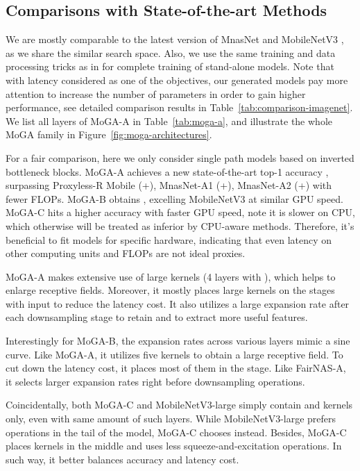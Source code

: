 \documentclass[letterpaper]{article} \usepackage{aaai20}  \usepackage{times}  \usepackage{helvet} \usepackage{courier}  \usepackage[hyphens]{url}  \usepackage{graphicx} \urlstyle{rm} \def\UrlFont{\rm}  \usepackage{graphicx}  \usepackage{amsmath}
\begin{document}
\subsection{Comparisons with State-of-the-art Methods}
We are mostly comparable to the latest version of MnasNet \cite{tan2018mnasnet} and MobileNetV3 \cite{howard2019searching}, as we share the similar search space. Also, we use the same training and data processing tricks as in \cite{tan2018mnasnet} for complete training of stand-alone models. Note that with latency considered as one of the objectives, our generated models pay more attention to increase the number of parameters in order to gain higher performance, see detailed comparison results in Table~\ref{tab:comparison-imagenet}. We list all layers of MoGA-A in Table~\ref{tab:moga-a}, and illustrate the whole MoGA family in Figure~\ref{fig:moga-architectures}. 


For a fair comparison, here we only consider single path models based on inverted bottleneck blocks. MoGA-A achieves a new state-of-the-art top-1 accuracy , surpassing Proxyless-R Mobile (+), MnasNet-A1 (+), MnasNet-A2 (+) with fewer FLOPs. MoGA-B obtains , excelling MobileNetV3 at similar GPU speed. MoGA-C hits a higher accuracy with faster GPU speed, note it is slower on CPU, which otherwise will be treated as inferior by CPU-aware methods. Therefore, it's beneficial to fit models for specific hardware, indicating that even latency on other computing units and FLOPs are not ideal proxies. 

MoGA-A makes extensive use of large kernels  (4 layers with ), which helps to enlarge receptive fields. Moreover, it mostly places large kernels on the stages with  input to reduce the latency cost. It also utilizes a large expansion rate after each downsampling stage to retain and to extract more useful features.

Interestingly for MoGA-B, the expansion rates across various layers mimic a sine curve. Like MoGA-A, it utilizes five  kernels to obtain a large receptive field. To cut down the latency cost, it places most of them in the  stage. Like FairNAS-A, it selects larger expansion rates right before downsampling operations.

Coincidentally, both MoGA-C and MobileNetV3-large simply contain  and  kernels only, even with same amount of such layers. While MobileNetV3-large prefers  operations in the tail of the model, MoGA-C chooses  instead. Besides, MoGA-C places  kernels in the middle and uses less squeeze-and-excitation operations. In such way, it better balances accuracy and latency cost.
\end{document}
